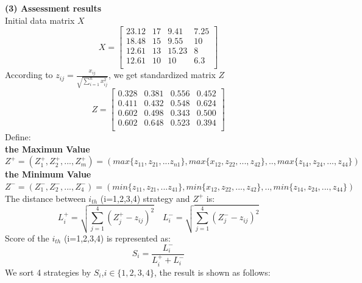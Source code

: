 \documentclass{mcmthesis}
\begin{document}
\textbf{(3) Assessment results}\\
 \hspace*{2em} Initial data matrix $X$
$$
X = 
\begin{bmatrix}
23.12 & 17 &  9.41& 7.25\\
18.48 & 15 &  9.55& 10\\
12.61 & 13 &  15.23& 8\\
12.61 & 10 &  10&    6.3\\
\end{bmatrix}
$$
 \hspace*{2em} According to  $z_{ij}=\frac{x_{ij}}{\sqrt{\sum_{i=1}^{n}x_{ij}^2}}$, we get standardized matrix $Z$ 
$$
Z = 
\begin{bmatrix}
 0.328 & 0.381 &0.556 & 0.452  \\
 0.411 & 0.432 &0.548 & 0.624   \\
 0.602 & 0.498 & 0.343 & 0.500  \\
 0.602 & 0.648 & 0.523 & 0.394 \\
\end{bmatrix}
$$
 \hspace*{2em} Define:\\ 
 \hspace*{2em} \textbf{the Maximun Value}\\
 \hspace*{2em}  $Z^{+}=(Z^{+}_{1}, Z^{+}_{2},...,Z^{+}_{m}) =(max\{z_{11},z_{21},...z_{n1}\},max\{x_{12},z_{22},...,z_{42}\},..,max\{z_{14},z_{24},...,z_{44}\}) $
 \hspace*{2em} \textbf{the Minimum Value} \\
 \hspace*{2em} $Z^{-}=(Z^{-}_{1}, Z^{-}_{2},...,Z^{-}_{4}) =(min\{z_{11},z_{21},...z_{41}\},min\{x_{12},z_{22},...,z_{42}\},..,min\{z_{14},z_{24},...,z_{44}\}) $
 \hspace*{2em}  The distance between $i_{th}$ (i=1,2,3,4) strategy and $Z^{+}$ is:
\begin{equation}
L^{+}_{i} = \sqrt{\sum_{j=1}^{4}(Z^{+}_{j}-z_{ij})^2}  \quad
L^{-}_{i} = \sqrt{\sum_{j=1}^{4}(Z^{-}_{j}-z_{ij})^2}
\end{equation}
 \hspace*{2em} Score of the $i_{th}$ (i=1,2,3,4) is represented as: 
\begin{equation}
S_{i}=\frac{L^{-}_{i}}{L^{+}_{i}+L^{-}_{i}}
\end{equation}
 \hspace*{2em} We sort 4 strategies by $S_{i}$,$i \in \{1,2,3,4\}$, the result is shown as follows:
\end{document}
